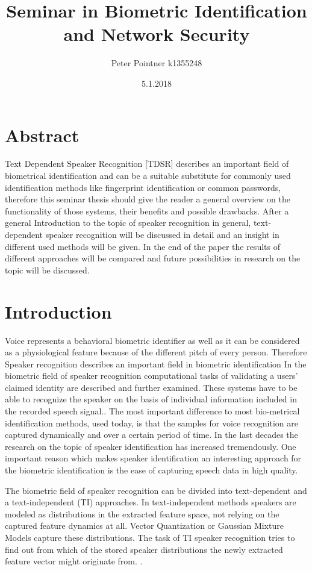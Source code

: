 \documentclass[12pt]{article}
\title{Seminar in Biometric Identification and Network Security}
\date{5.1.2018}
\author{Peter Pointner k1355248}
\begin{document}
	\maketitle
	\newpage
	
	\tableofcontents
	\newpage
	\section{Abstract}
Text Dependent Speaker Recognition [TDSR] describes an important field of biometrical identification and can be a suitable substitute for commonly used identification methods like fingerprint identification or common passwords, therefore this seminar thesis should give the reader a general overview on the functionality of those systems, their benefits and possible drawbacks. After a general Introduction to the topic of speaker recognition in general, text-dependent speaker recognition will be discussed in detail and an insight in different  used methods will be given. In the end of the paper the results of different approaches will be compared and future possibilities in research on the topic will be discussed.
\section{Introduction}
Voice  represents a behavioral biometric identifier as well as it can be considered as a physiological feature because of the different pitch of every person. Therefore Speaker recognition describes an important field in biometric identification In the biometric field of speaker recognition computational tasks of validating a users' claimed identity are described and further examined. These systems have to be able to recognize the speaker on the basis of individual information included in the recorded speech signal.\cite{various_techniques}.
The most important difference to most bio-metrical identification methods, used today, is that the samples for voice recognition are captured dynamically and over a certain period of time. \cite{piezo}  
In the last decades the research on the topic of speaker identification has increased tremendously. One important reason which makes speaker identification an interesting approach for the biometric identification is the ease of capturing speech data in high quality.

The biometric field of speaker recognition can be divided into text-dependent and a text-independent (TI) approaches. In text-independent methods speakers are modeled as distributions in the extracted feature space, not relying on the captured feature dynamics at all.  Vector Quantization or Gaussian Mixture Models capture these distributions. The task of TI speaker recognition tries to find out from which of the stored speaker distributions the newly extracted feature vector might originate from. \cite{sinogram}.
 
\end{document}
